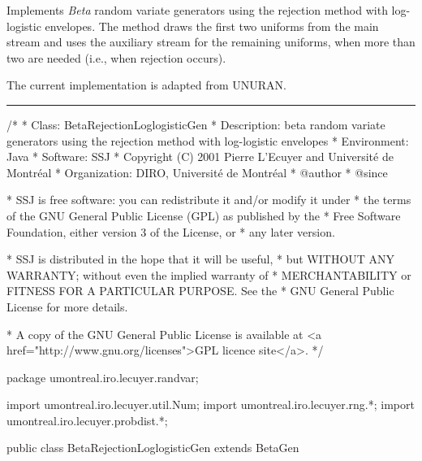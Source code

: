 
Implements {\em Beta\/} random variate generators using
the rejection method with log-logistic envelopes.
The method draws the first two uniforms from the main stream
and uses the auxiliary stream for the remaining uniforms, 
when more than two are needed (i.e., when rejection occurs).
\begin{detailed}
The current implementation is adapted from UNURAN.
\end{detailed}

\bigskip\hrule

\begin{code}
\begin{hide}
/*
 * Class:        BetaRejectionLoglogisticGen
 * Description:  beta random variate generators using the rejection method
                 with log-logistic envelopes
 * Environment:  Java
 * Software:     SSJ 
 * Copyright (C) 2001  Pierre L'Ecuyer and Université de Montréal
 * Organization: DIRO, Université de Montréal
 * @author       
 * @since

 * SSJ is free software: you can redistribute it and/or modify it under
 * the terms of the GNU General Public License (GPL) as published by the
 * Free Software Foundation, either version 3 of the License, or
 * any later version.

 * SSJ is distributed in the hope that it will be useful,
 * but WITHOUT ANY WARRANTY; without even the implied warranty of
 * MERCHANTABILITY or FITNESS FOR A PARTICULAR PURPOSE.  See the
 * GNU General Public License for more details.

 * A copy of the GNU General Public License is available at
   <a href="http://www.gnu.org/licenses">GPL licence site</a>.
 */
\end{hide}
package umontreal.iro.lecuyer.randvar;\begin{hide}
import umontreal.iro.lecuyer.util.Num;
import umontreal.iro.lecuyer.rng.*;
import umontreal.iro.lecuyer.probdist.*;
\end{hide}

public class BetaRejectionLoglogisticGen extends BetaGen \begin{hide} {
    
   private RandomStream auxStream;
   // Parameters for rejection with log-logistic envelopes
   private static final int bb = 0;
   private static final int bc = 1;
   private double am;
   private double bm;
   private double al;
   private double alnam;
   private double be;
   private double ga;
   private double si;
   private double rk1;
   private double rk2;

\end{hide}
\end{code}

